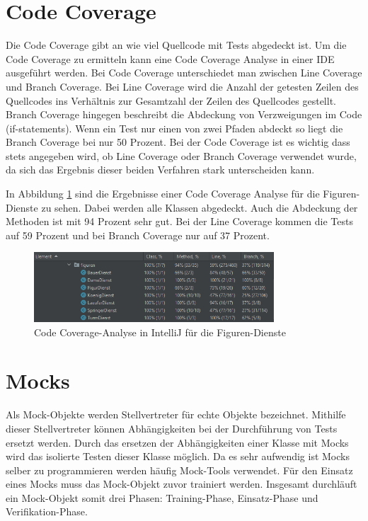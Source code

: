 \section{Code Coverage}
Die Code Coverage gibt an wie viel Quellcode mit Tests abgedeckt ist. Um die Code Coverage zu ermitteln kann eine Code Coverage Analyse in einer IDE ausgeführt werden. Bei Code Coverage unterschiedet man zwischen Line Coverage und Branch Coverage. Bei Line Coverage wird die Anzahl der getesten Zeilen des Quellcodes ins Verhältnis zur Gesamtzahl der Zeilen des Quellcodes gestellt. Branch Coverage hingegen beschreibt die Abdeckung von Verzweigungen im Code (if-statements). Wenn ein Test nur einen von zwei Pfaden abdeckt so liegt die Branch Coverage bei nur 50 Prozent. Bei der Code Coverage ist es wichtig dass stets angegeben wird, ob Line Coverage oder Branch Coverage verwendet wurde, da sich das Ergebnis dieser beiden Verfahren stark unterscheiden kann.

In Abbildung \ref{fig:CodeCoverage} sind die Ergebnisse einer Code Coverage Analyse für die Figuren-Dienste zu sehen. Dabei werden alle Klassen abgedeckt. Auch die Abdeckung der Methoden ist mit 94 Prozent sehr gut. Bei der Line Coverage kommen die Tests auf 59 Prozent und bei Branch Coverage nur auf 37 Prozent.
\begin{figure}[ht]
	\centering
	\includegraphics[width=0.8\textwidth]{Bilder/CodeCoverage.png} 
	\caption{Code Coverage-Analyse in IntelliJ für die Figuren-Dienste}
	\label{fig:CodeCoverage}
\end{figure}


\section{Mocks}
Als Mock-Objekte werden Stellvertreter für echte Objekte bezeichnet. Mithilfe dieser Stellvertreter können Abhängigkeiten bei der Durchführung von Tests ersetzt werden. Durch das ersetzen der Abhängigkeiten einer Klasse mit Mocks wird das isolierte Testen dieser Klasse möglich. Da es sehr aufwendig ist Mocks selber zu programmieren werden häufig Mock-Tools verwendet. Für den Einsatz eines Mocks muss das Mock-Objekt zuvor trainiert werden. Insgesamt durchläuft ein Mock-Objekt somit drei Phasen: Training-Phase, Einsatz-Phase und Verifikation-Phase. 

